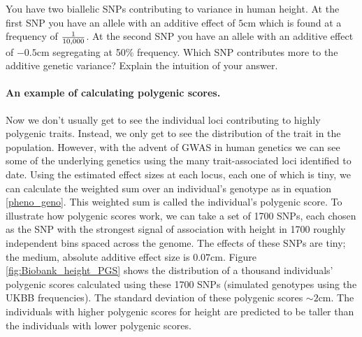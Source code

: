 \begin{question}
You have two biallelic SNPs contributing to variance in human height. At the first SNP you have an allele with an additive effect of $5$cm which is found at a frequency of $\nicefrac{1}{10,000}$. At the second SNP you have an allele with an additive effect of $-0.5$cm segregating at 50\% frequency. Which SNP contributes more to the additive genetic variance? Explain the intuition of your answer.
\end{question}
\paragraph{An example of calculating polygenic scores.}
Now we don't usually get to see the individual loci contributing to highly polygenic traits. Instead, we only get to see the distribution of the trait in the population. However, with the advent of GWAS in human genetics we can see some of the underlying genetics using the many trait-associated loci identified to date. Using the estimated effect sizes at each locus, each one of which is tiny, we can calculate the weighted sum over an individual's genotype as in equation \ref{pheno_geno}. This weighted sum is called the individual's polygenic score. To illustrate how polygenic scores work, we can take a set of 1700 SNPs, each chosen as the SNP with the strongest signal of association with height in 1700 roughly independent bins spaced across the genome. The effects of these SNPs are tiny; the medium, absolute additive effect size is $0.07$cm. Figure \ref{fig:Biobank_height_PGS} shows the distribution of a thousand individuals' polygenic scores calculated using these 1700 SNPs (simulated genotypes using the UKBB frequencies). The standard deviation of these polygenic scores $\sim 2$cm. 
The individuals with higher polygenic scores for height are predicted to be taller than the individuals with lower polygenic scores. 

